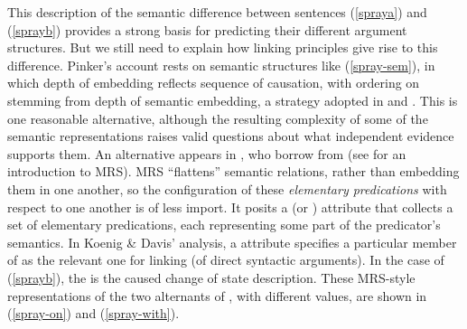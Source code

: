 \documentclass[output=paper
 	        ,biblatex
                ,babelshorthands
                ,newtxmath
                ,draftmode
                ,colorlinks, citecolor=brown
]{langscibook}
\begin{document}
This description of the semantic difference between sentences (\ref{spraya}) and (\ref{sprayb}) provides a strong basis for predicting their different argument structures.
But we still need to explain how linking principles give rise to this difference.
Pinker's account rests on semantic structures like (\ref{spray-sem}), in which depth of embedding reflects sequence of causation, with ordering on \argst stemming from depth of semantic embedding, a strategy adopted in \citet{Davis1996} and \citet{Davis2001}.
This is one reasonable alternative, although the resulting complexity of some of the semantic representations raises valid questions about what independent evidence supports them.
An alternative appears in \citet{KoenigandDavis2006}, who borrow from  (see  for an introduction to MRS).
MRS ``flattens'' semantic relations, rather than embedding them in one another, so the configuration of these \emph{elementary predications} with respect to one another is of less import.
It posits a  (or \rels) attribute that collects a set of elementary predications, each representing some part of the predicator's semantics.
In Koenig \& Davis' analysis, a  attribute specifies a particular member of \rels as the relevant one for linking (of direct syntactic arguments).
In the case of (\ref{sprayb}), the  is the caused change of state description.
These MRS-style representations of the two alternants of , with different  values, are shown in (\ref{spray-on}) and (\ref{spray-with}).

\begin{exe}
\ex\label{spray-on}
\end{exe}

\begin{exe}\ex\label{spray-with}
\end{exe}                  
\end{document}
